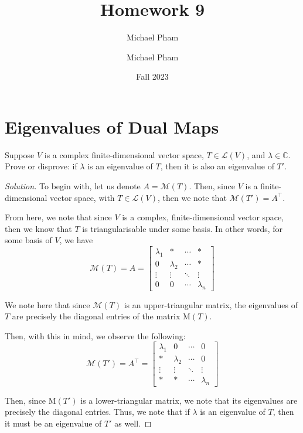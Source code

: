 \documentclass{article}
\title{#1}
\author{Michael Pham}
\date{#2}
\newenvironment{solution}{\begin{proof}[Solution]}{\end{proof}}
\newcommand{\CC}{\mathbb{C}}
\newcommand{\mytitle}[2]{%
	\title{#1}
	\author{Michael Pham}
	\date{#2}
	\maketitle
	\newpage
	\tableofcontents
	\newpage
}
\begin{document}
	\mytitle{Homework 9}{Fall 2023}
	
	\section{Eigenvalues of Dual Maps}
	\begin{hw}
		Suppose $V$ is a complex finite-dimensional vector space, $T \in \mathcal L(V)$, and $\lambda \in \CC$. Prove or disprove:
		if $\lambda$ is an eigenvalue of $T$, then it is also an eigenvalue of $T'$.
	\end{hw}
	\begin{solution}
		To begin with, let us denote $A = \mathcal{M}(T)$. Then, since $V$ is a finite-dimensional vector space, with $T \in \mathcal L(V)$, then we note that $\mathcal{M}(T') = A^{\intercal}$.
		
		From here, we note that since $V$ is a complex, finite-dimensional vector space, then we know that $T$ is triangularisable under some basis. In other words, for some basis of $V$, we have
		\begin{equation*}
			\mathcal{M}(T) = A = \begin{bmatrix}
				\lambda_{1} & * & \cdots & * \\
				0 & \lambda_{2} & \cdots & * \\
				\vdots & \vdots & \ddots & \vdots \\
				0 & 0 & \cdots & \lambda_n
			\end{bmatrix}
		\end{equation*}
	
		We note here that since $\mathcal{M}(T)$ is an upper-triangular matrix, the eigenvalues of $T$ are precisely the diagonal entries of the matrix $\mathrm{M}(T)$.
	
		Then, with this in mind, we observe the following:
		\begin{equation*}
			\mathcal{M}(T') = A^{\intercal} = \begin{bmatrix}
				\lambda_1 & 0 & \cdots & 0 \\
				* & \lambda_2 & \cdots & 0 \\
				\vdots & \vdots & \ddots & \vdots \\
				* & * & \cdots & \lambda_n
			\end{bmatrix}
		\end{equation*}
	
		Then, since $\mathrm{M}(T')$ is a lower-triangular matrix, we note that its eigenvalues are precisely the diagonal entries. Thus, we note that if $\lambda$ is an eigenvalue of $T$, then it must be an eigenvalue of $T'$ as well. 
		\begin{comment}
			then there exists at least one $\lambda$ such that:
		\begin{equation*}
			A - \lambda I \neq 0.
		\end{equation*}
	

\end{comment}
\end{solution}
\end{document}

